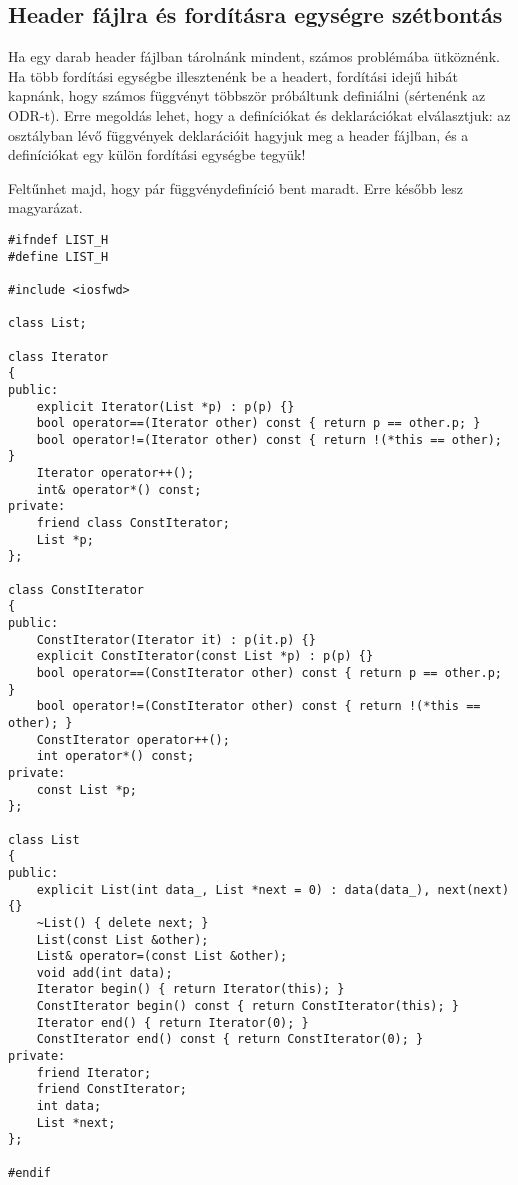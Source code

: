 \documentclass[../cpp_book/cpp_book.tex]{subfiles}
\begin{document}
	\subsection{Header fájlra és fordításra egységre szétbontás}
	Ha egy darab header fájlban tárolnánk mindent, számos problémába ütköznénk. Ha több fordítási egységbe illesztenénk be a headert, fordítási idejű hibát kapnánk, hogy számos függvényt többször próbáltunk definiálni (sértenénk az ODR-t). Erre megoldás lehet, hogy a definíciókat és deklarációkat elválasztjuk: az osztályban lévő függvények deklarációit hagyjuk meg a header fájlban, és a definíciókat egy külön fordítási egységbe tegyük!
	
	\begin{note}
		Feltűnhet majd, hogy pár függvénydefiníció bent maradt. Erre később lesz magyarázat.
	\end{note}
	
	\medskip
\begin{lstlisting}
#ifndef LIST_H
#define LIST_H

#include <iosfwd>

class List;

class Iterator 
{
public:
	explicit Iterator(List *p) : p(p) {}
	bool operator==(Iterator other) const { return p == other.p; }
	bool operator!=(Iterator other) const { return !(*this == other); }
	Iterator operator++();
	int& operator*() const;
private:
	friend class ConstIterator;
	List *p;
};

class ConstIterator
{
public:
	ConstIterator(Iterator it) : p(it.p) {}
	explicit ConstIterator(const List *p) : p(p) {}
	bool operator==(ConstIterator other) const { return p == other.p; }
	bool operator!=(ConstIterator other) const { return !(*this == other); }
	ConstIterator operator++();
	int operator*() const;
private:
	const List *p;
};

class List 
{
public:
	explicit List(int data_, List *next = 0) : data(data_), next(next) {}
	~List() { delete next; }
	List(const List &other);
	List& operator=(const List &other);
	void add(int data);
	Iterator begin() { return Iterator(this); }
	ConstIterator begin() const { return ConstIterator(this); }
	Iterator end() { return Iterator(0); }
	ConstIterator end() const { return ConstIterator(0); }
private:
	friend Iterator;
	friend ConstIterator;
	int data;
	List *next;
};

#endif
\end{lstlisting}
\end{document}
